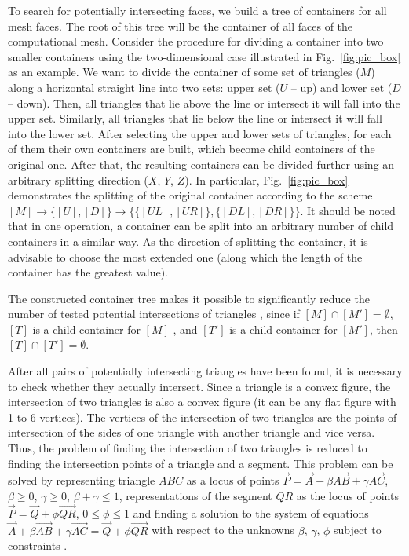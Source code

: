 To search for potentially intersecting faces, we build a tree of
containers  for all mesh faces.
The root of this tree will be the container of all faces of the
computational  mesh.
Consider the procedure for dividing a container into two smaller
containers  using the two-dimensional case illustrated in
Fig.~\ref{fig:pic_box} as an example.
We want to divide the container of some set of triangles ($M$) along
a  horizontal straight line into two sets: upper set ($U$ -- up) and
lower set ($D$ -- down).
Then, all triangles that lie above the line or intersect it will
fall into the upper set.
Similarly, all triangles that lie below the line or intersect it will fall into the lower set.
After selecting the upper and lower sets of triangles, for each of them their own containers are built, which become child containers of the original one.
After that, the resulting containers can be divided further using an arbitrary splitting direction ($X$, $Y$, $Z$).
In particular, Fig.~\ref{fig:pic_box} demonstrates the splitting of the original container according to the scheme $[M] \rightarrow \{[U], [D]\} \rightarrow \{\{[UL], [UR]\}, \{[DL], [DR]\}\}$.
It should be noted that in one operation, a container can be split into an arbitrary number of child containers in a similar way.
As the direction of splitting the container, it is advisable to choose the most extended one (along which the length of the container has the greatest value).

The constructed container tree makes it possible to significantly reduce the number of tested potential intersections of triangles \cite{Jung}, since if $[M] \cap [M'] = \emptyset$, $[T]$ is a child container for $[M]$ , and $[T']$ is a child container for $[M']$, then $[T] \cap [T'] = \emptyset$.

After all pairs of potentially intersecting triangles have been found, it is necessary to check whether they actually intersect.
Since a triangle is a convex figure, the intersection of two triangles is also a convex figure (it can be any flat figure with 1 to 6 vertices).
The vertices of the intersection of two triangles are the points of intersection of the sides of one triangle with another triangle and vice versa.
Thus, the problem of finding the intersection of two triangles is reduced to finding the intersection points of a triangle and a segment.
This problem can be solved by representing triangle $ABC$ as a locus of points $\vec{P} = \vec{A} + \beta \vec{AB} + \gamma \vec{AC}$, $\beta \ge 0$, $\gamma \ge 0$, $\beta + \gamma \le 1$, representations of the segment $QR$ as the locus of points $\vec{P} = \vec{Q} + \phi \vec{QR}$, $0 \le \phi \le 1$ and finding a solution to the system of equations $\vec{A} + \beta \vec{AB} + \gamma \vec{AC} = \vec{Q} + \phi \vec{QR}$ with respect to the unknowns $\beta$, $\gamma$, $\phi$ subject to constraints \cite{Freylekhman}.


